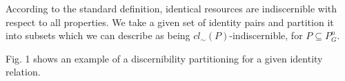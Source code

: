 According to the standard definition,
  identical resources are indiscernible with respect to all properties.
We take a given set of identity pairs and partition it into subsets which
  we can describe as being $cl_{\sim}(P)$-indiscernible,
  for $P \subseteq P_G^n$.

Fig. 1 shows an example
  of a discernibility partitioning for a given identity relation.

\begin{comment}
\begin{figure*}
\label{fig:iimb_example}
\centering
\texttt{[image: iimb\_approximation\_example\_crop]}
\caption{
  An example of a discernibility partition for an identity relation
    consisting of 365 pairs applied to the fourth IIMB linkset.
  Each node is annotated with the set of predicates $P$ for which
    its pairs are $P$-indiscernible.
  The number of identity pairs within each partition set
    is displayed to the right of the predicate set label.
  Partition sets that contain no identity pair are not show.
  The number that occurs to the left of the predicate label in each node
    indicates how may pairs in that node are identity pairs.
  The lower approximation consists of the nodes with a solid border,
    indicating that they contain only identity pairs.
  The higher approximation consists of all displayed nodes.}
\end{figure*}
\end{comment}

